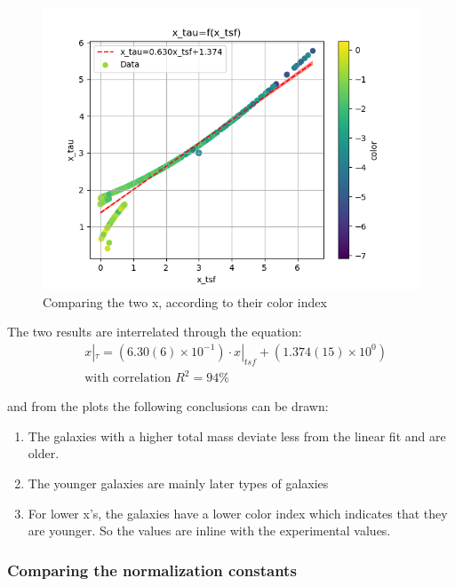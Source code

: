 \documentclass[a4paper,twocolumn]{article}
\begin{document}
\begin{figure}[!htpb]
\centering
\includegraphics[width=.9\linewidth]{./figs/x_tsf-x_tau-color_color.png}
\caption{\label{fig:Comparing the two x, according to their color index}Comparing the two x, according to their color index}
\end{figure}

The two results are interrelated through the equation:
\begin{equation}\label{eq:x_tsf-x_tau}
\begin{align}
& x|_\tau = (6.30(6) \times 10^{-1})\cdot x|_{tsf} + (1.374(15) \times 10^{0}) \\ 
& \textrm{with correlation } R^2=94\%
\end{align}
\end{equation}

and from the plots the following conclusions can be drawn:

\begin{enumerate}
\item The galaxies with a higher total mass deviate less from the linear fit and are older.
\item The younger galaxies are mainly later types of galaxies
\item For lower x's, the galaxies have a lower color index which indicates that they are younger. So the values are inline with the experimental values.
\end{enumerate}

\subsubsection{Comparing the normalization constants}
\label{sec:org4dd08f6}
\end{document}

